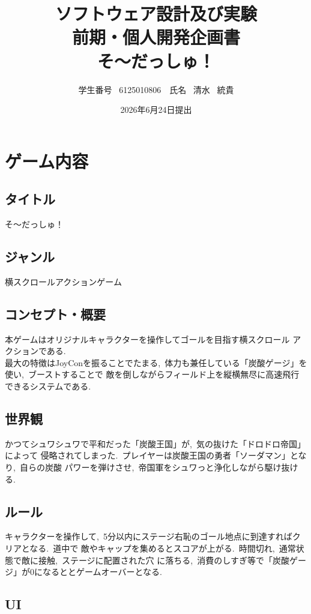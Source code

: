\documentclass[dvipdfmx]{jsarticle}
\title{ソフトウェア設計及び実験\\前期・個人開発企画書\\
    \huge{そ〜だっしゅ！}
}
\author{学生番号 \ 6125010806　氏名 \ 清水 \ 統貴}
\date{2026年6月24日提出}
\begin{document}
\maketitle

\section{ゲーム内容}
%
\subsection{タイトル}
%
そ〜だっしゅ！

\subsection{ジャンル}
%
横スクロールアクションゲーム

\subsection{コンセプト・概要}
%
本ゲームはオリジナルキャラクターを操作してゴールを目指す横スクロール
アクションである.\\
最大の特徴はJoyConを振ることでたまる,\ 体力も兼任している「炭酸ゲージ」を使い,\ ブーストすることで
敵を倒しながらフィールド上を縦横無尽に高速飛行できるシステムである. 

\subsection{世界観}
%
かつてシュワシュワで平和だった「炭酸王国」が,\ 気の抜けた「ドロドロ帝国」によって
侵略されてしまった.\ プレイヤーは炭酸王国の勇者「ソーダマン」となり,\ 自らの炭酸
パワーを弾けさせ,\ 帝国軍をシュワっと浄化しながら駆け抜ける.\\

\subsection{ルール}
%
キャラクターを操作して,\ 5分以内にステージ右恥のゴール地点に到達すればクリアとなる.\ 道中で
敵やキャップを集めるとスコアが上がる.\ 時間切れ,\ 通常状態で敵に接触,\ ステージに配置された穴
に落ちる,\ 消費のしすぎ等で「炭酸ゲージ」が0になるととゲームオーバーとなる.\\

\subsection{UI}
%
\end{document}
